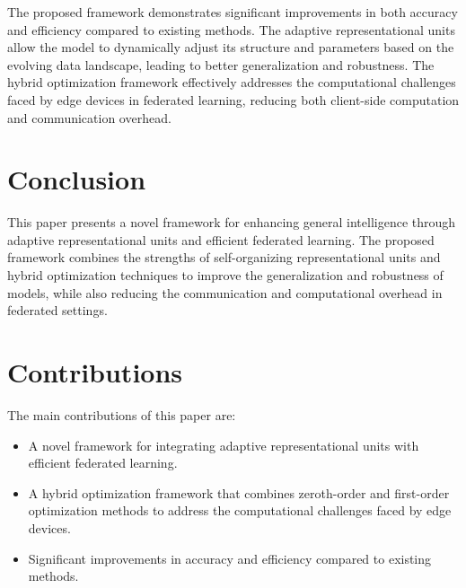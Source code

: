 \documentclass{article}
\begin{document}
The proposed framework demonstrates significant improvements in both accuracy and efficiency compared to existing methods. The adaptive representational units allow the model to dynamically adjust its structure and parameters based on the evolving data landscape, leading to better generalization and robustness. The hybrid optimization framework effectively addresses the computational challenges faced by edge devices in federated learning, reducing both client-side computation and communication overhead.

\section{Conclusion}
\label{sec:conclusion}

This paper presents a novel framework for enhancing general intelligence through adaptive representational units and efficient federated learning. The proposed framework combines the strengths of self-organizing representational units and hybrid optimization techniques to improve the generalization and robustness of models, while also reducing the communication and computational overhead in federated settings.

\section{Contributions}
\label{sec:contributions}

The main contributions of this paper are:
\begin{itemize}
    \item A novel framework for integrating adaptive representational units with efficient federated learning.
    \item A hybrid optimization framework that combines zeroth-order and first-order optimization methods to address the computational challenges faced by edge devices.
    \item Significant improvements in accuracy and efficiency compared to existing methods.
\end{itemize}
\end{document}
